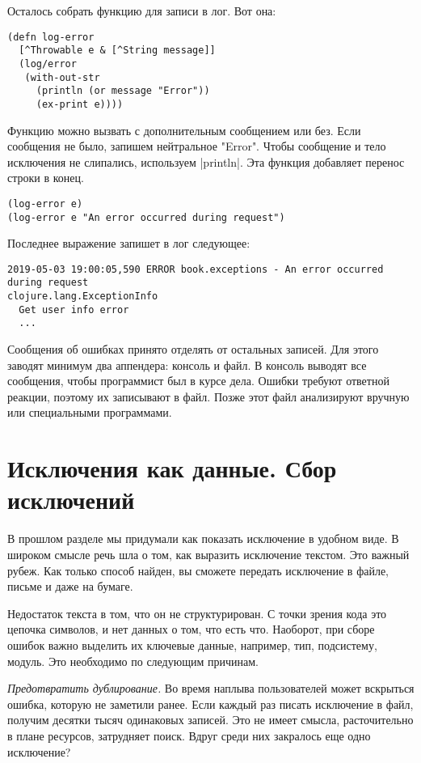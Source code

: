 Осталось собрать функцию для записи в лог. Вот она:

\begin{verbatim}
(defn log-error
  [^Throwable e & [^String message]]
  (log/error
   (with-out-str
     (println (or message "Error"))
     (ex-print e))))
\end{verbatim}

Функцию можно вызвать с дополнительным сообщением или без. Если сообщения не
было, запишем нейтральное "Error". Чтобы сообщение и тело исключения не
слипались, используем \spverb|println|. Эта функция добавляет перенос строки в конец.

\begin{verbatim}
(log-error e)
(log-error e "An error occurred during request")
\end{verbatim}

Последнее выражение запишет в лог следующее:

\begin{verbatim}
2019-05-03 19:00:05,590 ERROR book.exceptions - An error occurred during request
clojure.lang.ExceptionInfo
  Get user info error
  ...
\end{verbatim}

Сообщения об ошибках принято отделять от остальных записей. Для этого заводят
минимум два аппендера: консоль и файл. В консоль выводят все сообщения, чтобы
программист был в курсе дела. Ошибки требуют ответной реакции, поэтому их
записывают в файл. Позже этот файл анализируют вручную или специальными
программами.

\section{Исключения как данные. Сбор исключений}

В прошлом разделе мы придумали как показать исключение в удобном виде. В широком
смысле речь шла о том, как выразить исключение текстом. Это важный рубеж. Как
только способ найден, вы сможете передать исключение в файле, письме и даже на
бумаге.

Недостаток текста в том, что он не структурирован. С точки зрения кода это
цепочка символов, и нет данных о том, что есть что. Наоборот, при сборе ошибок
важно выделить их ключевые данные, например, тип, подсистему, модуль. Это
необходимо по следующим причинам.

\emph{Предотвратить дублирование.} Во время наплыва пользователей может вскрыться
ошибка, которую не заметили ранее. Если каждый раз писать исключение в файл,
получим десятки тысяч одинаковых записей. Это не имеет смысла, расточительно в
плане ресурсов, затрудняет поиск. Вдруг среди них закралось еще одно исключение?

